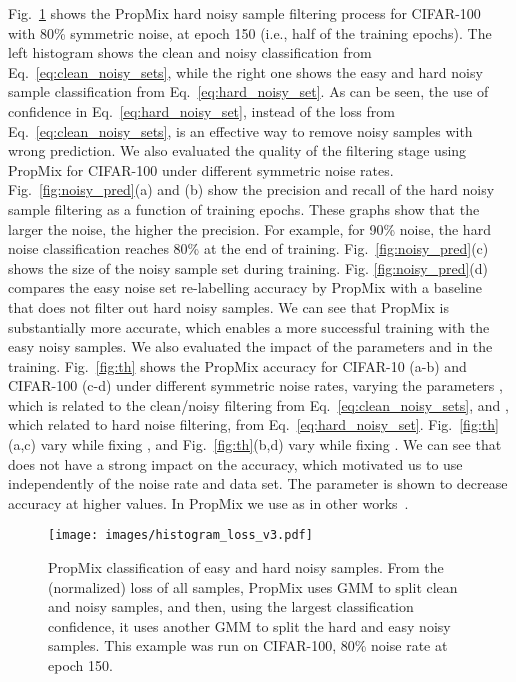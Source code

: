 \documentclass{bmvc2k}
\begin{document}
 Fig.~\ref{fig:propmix_hist} shows the PropMix hard noisy sample filtering process for CIFAR-100 with 80\% symmetric noise, at epoch 150 (i.e., half of the training epochs). 
 The left histogram shows the clean and noisy classification from Eq.~\ref{eq:clean_noisy_sets}, while the right one shows the easy and hard noisy sample classification from Eq.~\eqref{eq:hard_noisy_set}.
As can be seen, the use of confidence in Eq.~\eqref{eq:hard_noisy_set}, instead of the loss from Eq.~\ref{eq:clean_noisy_sets}, is an effective way to remove noisy samples with wrong prediction. 
We also evaluated the quality of the filtering stage using PropMix for CIFAR-100 under different symmetric noise rates. Fig.~\ref{fig:noisy_pred}(a) and (b) show the precision and recall of the hard noisy sample filtering as a function of training epochs.  These graphs show that the larger the noise, the higher the precision. 
For example, for 90\% noise, the hard noise classification reaches 80\% at the end of training. 
Fig.~\ref{fig:noisy_pred}(c) shows the size of the  noisy sample set during training. 
Fig. \ref{fig:noisy_pred}(d) compares the easy noise set re-labelling accuracy by PropMix with a baseline that does not filter out hard noisy samples. 
We can see that PropMix is substantially more accurate,
which enables a more successful training with the easy noisy samples. We also evaluated the impact of the parameters  and  in the training. Fig.~\ref{fig:th} shows the PropMix accuracy for CIFAR-10 (a-b) and CIFAR-100 (c-d) under different symmetric noise rates, varying the parameters , which is related to the clean/noisy filtering from Eq.~\ref{eq:clean_noisy_sets}, and , which related to hard noise filtering, from Eq.~\ref{eq:hard_noisy_set}. Fig.~\ref{fig:th}(a,c) vary  while fixing , and Fig.~\ref{fig:th}(b,d) vary  while fixing . We can see that  does not have a strong impact on the accuracy, which motivated us to use  independently of the noise rate and data set. The parameter  is shown to decrease accuracy at higher values. In PropMix we use  as in other works~\cite{DivideMix}. 

\begin{figure}[!ht]
\centering
\texttt{[image: images/histogram\_loss\_v3.pdf]}
\caption{PropMix classification of easy and hard noisy samples. From the (normalized) loss of all samples, PropMix uses GMM to split clean and noisy samples, and then, using the largest classification confidence, it uses another GMM to split the hard and easy noisy samples. This example was run on CIFAR-100, 80\% noise rate at epoch 150.  }
\label{fig:propmix_hist}
\end{figure}
\end{document}
